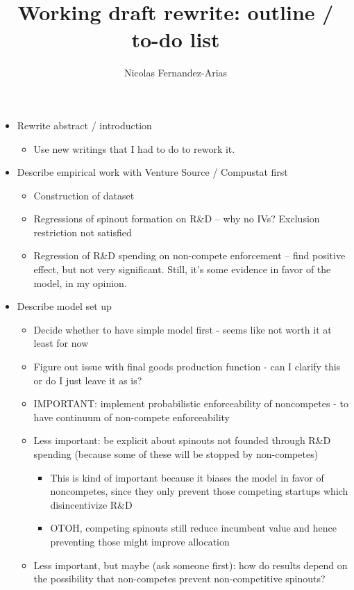\documentclass[11pt,english]{article}
\theoremstyle{remark}
\begin{document}
	
\title{Working draft rewrite: outline / to-do list}
\author{Nicolas Fernandez-Arias}
\maketitle

\begin{itemize}
	\item Rewrite abstract / introduction
	\begin{itemize}
		\item Use new writings that I had to do to rework it.
	\end{itemize}
	\item Describe empirical work with Venture Source / Compustat first
	\begin{itemize}
		\item Construction of dataset
		\item Regressions of spinout formation on R\&D -- why no IVs? Exclusion restriction not satisfied
		\item Regression of R\&D spending on non-compete enforcement -- find positive effect, but not very significant. Still, it's some evidence in favor of the model, in my opinion.
	\end{itemize}
	\item Describe model set up
	\begin{itemize}
		\item Decide whether to have simple model first - seems like not worth it at least for now
		\item Figure out issue with final goods production function - can I clarify this or do I just leave it as is?
		\item IMPORTANT: implement probabilistic enforceability of noncompetes - to have continuum of non-compete enforceability
		\item Less important: be explicit about spinouts not founded through R\&D spending (because some of these will be stopped by non-competes)
		\begin{itemize}
			\item This is kind of important because it biases the model in favor of noncompetes, since they only prevent those competing startups which disincentivize R\&D
			\item OTOH, competing spinouts still reduce incumbent value and hence preventing those might improve allocation
		\end{itemize} 
		\item Less important, but maybe (ask someone first): how do results depend on the possibility that non-competes prevent non-competitive spinouts? 

\end{itemize}
\end{itemize}
\end{document}
